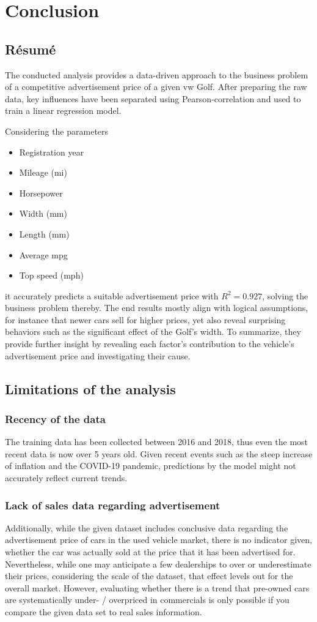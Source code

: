 \chapter{Conclusion}
\section{Résumé}

The conducted analysis provides a data-driven approach to the business problem of a competitive advertisement price of a given \ac{vw} Golf.
After preparing the raw data, key influences have been separated using Pearson-correlation and used to train a linear regression model.
\par
Considering the parameters 
\begin{itemize}
    \item Registration year
    \item Mileage (mi)
    \item Horsepower
    \item Width (mm)
    \item Length (mm)
    \item Average mpg
    \item Top speed (mph)
\end{itemize}
it accurately predicts a suitable advertisement price with $R^2 = 0.927$, solving the business problem thereby.
The end results mostly align with logical assumptions, for instance that newer cars sell for higher prices, yet also reveal
surprising behaviors such as the significant effect of the Golf's width.
To summarize, they provide further insight by revealing each factor's contribution to the vehicle's advertisement price and investigating their cause.
\section{Limitations of the analysis}
\subsection{Recency of the data}
The training data has been collected between 2016 and 2018, thus even the most recent data
is now over 5 years old. Given recent events such as the steep increase of inflation
and the COVID-19 pandemic, predictions by the model might not accurately reflect current trends.

\subsection{Lack of sales data regarding advertisement}
Additionally, while the given dataset includes conclusive data regarding the advertisement price of cars in the used vehicle market,
there is no indicator given, whether the car was actually sold at the price that it has been advertised for. 
\newline
Nevertheless, while one may anticipate a few dealerships to over or underestimate their prices,
considering the scale of the dataset, that effect levels out for the overall market.
However, evaluating whether there is a trend that pre-owned cars are systematically under- / overpriced in commercials
is only possible if you compare the given data set to real sales information.


